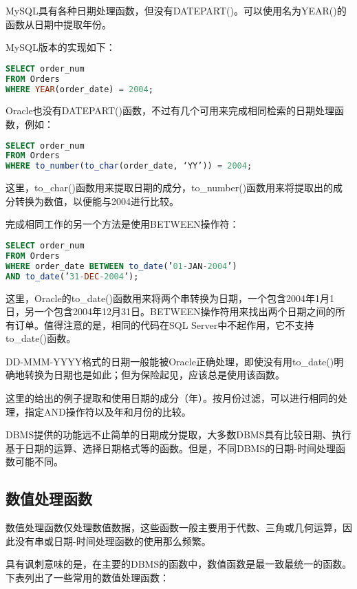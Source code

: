 MySQL具有各种日期处理函数，但没有DATEPART()。可以使用名为YEAR()的函数从日期中提取年份。

MySQL版本的实现如下：

\begin{lstlisting}[language=SQL]
SELECT order_num
FROM Orders
WHERE YEAR(order_date) = 2004;
\end{lstlisting}

Oracle也没有DATEPART()函数，不过有几个可用来完成相同检索的日期处理函数，例如：

\begin{lstlisting}[language=SQL]
SELECT order_num
FROM Orders
WHERE to_number(to_char(order_date, ‘YY’)) = 2004;
\end{lstlisting}

这里，to\_char()函数用来提取日期的成分，to\_number()函数用来将提取出的成分转换为数值，以便能与2004进行比较。

完成相同工作的另一个方法是使用BETWEEN操作符：

\begin{lstlisting}[language=SQL]
SELECT order_num
FROM Orders
WHERE order_date BETWEEN to_date(’01-JAN-2004’) 
AND to_date(’31-DEC-2004’);
\end{lstlisting}


这里，Oracle的to\_date()函数用来将两个串转换为日期，一个包含2004年1月1日，另一个包含2004年12月31日。BETWEEN操作符用来找出两个日期之间的所有订单。值得注意的是，相同的代码在SQL Server中不起作用，它不支持to\_date()函数。

DD-MMM-YYYY格式的日期一般能被Oracle正确处理，即使没有用to\_date()明确地转换为日期也是如此；但为保险起见，应该总是使用该函数。

这里的给出的例子提取和使用日期的成分（年）。按月份过滤，可以进行相同的处理，指定AND操作符以及年和月份的比较。

DBMS提供的功能远不止简单的日期成分提取，大多数DBMS具有比较日期、执行基于日期的运算、选择日期格式等的函数。但是，不同DBMS的日期-时间处理函数可能不同。


\subsection{数值处理函数}

数值处理函数仅处理数值数据，这些函数一般主要用于代数、三角或几何运算，因此没有串或日期-时间处理函数的使用那么频繁。

具有讽刺意味的是，在主要的DBMS的函数中，数值函数是最一致最统一的函数。下表列出了一些常用的数值处理函数：

